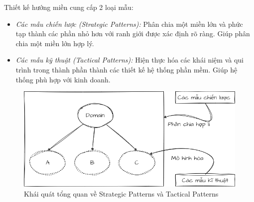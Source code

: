 Thiết kế hướng miền cung cấp 2 loại mẫu:

\begin{itemize}

\item \emph{Các mẫu chiến lược (Strategic Patterns):} Phân chia một miền lớn và phức tạp thành các phần nhỏ hơn với ranh giới được xác định rõ ràng. Giúp phân chia một miền lớn hợp lý.

\item \emph{Các mẫu kỹ thuật (Tactical Patterns):} Hiện thực hóa các khái niệm và qui trình trong thành phần thành các thiết kế hệ thống phần mềm. Giúp hệ thống phù hợp với kinh doanh.

\end{itemize}

\begin{figure}[H]

\centering

\includegraphics[scale = 0.5]{pictures/cac_mau_chien_luoc_va_cac_mau_ky_thuat/main.drawio.png}

\caption{Khái quát tổng quan về Strategic Patterns và Tactical Patterns}

\end{figure}